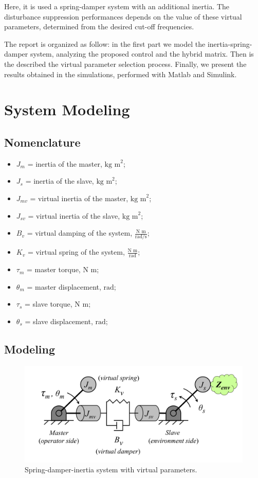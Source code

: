 Here, it is used a spring-damper system with an additional inertia.
The disturbance suppression performances depends on the value of these virtual parameters, determined from the desired cut-off frequencies.

The report is organized as follow: in the first part we model the inertia-spring-damper system, analyzing the proposed control and the hybrid matrix. Then is the described the virtual parameter selection process. Finally, we present the results obtained in the simulations, performed with Matlab and Simulink.

\section{System Modeling}

\subsection*{Nomenclature}

\begin{itemize}
	\item $ J_m $ = inertia of the master, $ \text{kg m}^2 $;
	\item $ J_s $ = inertia of the slave,  $ \text{kg m}^2 $;
	\item $ J_{mv} $ = virtual inertia of the master,  $ \text{kg m}^2 $;
	\item $ J_{sv} $ = virtual inertia of the slave,  $ \text{kg m}^2 $;
	\item $ B_v $ = virtual damping of the system, $ \frac{\text{N m}}{\text{rad/s}} $;
	\item $ K_v $ = virtual spring of the system, $ \frac{\text{N m}}{\text{rad}} $;
	\item $ \tau_m $ = master torque, $ \text{N m} $;
	\item $ \theta_m $ = master displacement, $ \text{rad} $; 
	\item $ \tau_s $ = slave torque, $ \text{N m} $;
	\item $ \theta_s $ = slave displacement, $ \text{rad} $;
\end{itemize}

\subsection{Modeling}

\begin{figure}[h]
	\centering
	\includegraphics[width=0.7\linewidth]{Images/spring_damper_inertia_system}
	\caption{Spring-damper-inertia system with virtual parameters.}
	\label{fig:springdamperinertiasystem}
\end{figure}


